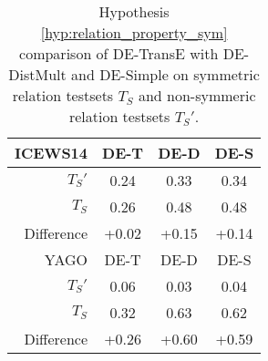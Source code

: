 \begin{table}[htb]
\centering
\begin{minipage}{\columnwidthcaption}
\centering
\caption{Hypothesis \autoref{hyp:relation_property_sym} comparison of DE-TransE with DE-DistMult and DE-Simple on symmetric relation testsets $T_S$ and non-symmeric relation testsets $T_S'$.}
\vspace{-3mm}

\begin{tabular}{r|ccc}\hline
ICEWS14 & DE-T & DE-D & DE-S \\ \hline
$T_S'$ & 0.24 & 0.33 & 0.34 \\
$T_S$ & 0.26 & 0.48 & 0.48 \\ \hline
Difference & +0.02 & +0.15 & +0.14 \\ \hline\hline
YAGO & DE-T & DE-D & DE-S \\ \hline
$T_S'$ & 0.06 & 0.03 & 0.04 \\
$T_S$ & 0.32 & 0.63 & 0.62 \\ \hline
Difference & +0.26 & +0.60 & +0.59 \\
 \hline
\end{tabular}

\label{tab:hypothesis_3_a_comparison}
\end{minipage}
\end{table}

